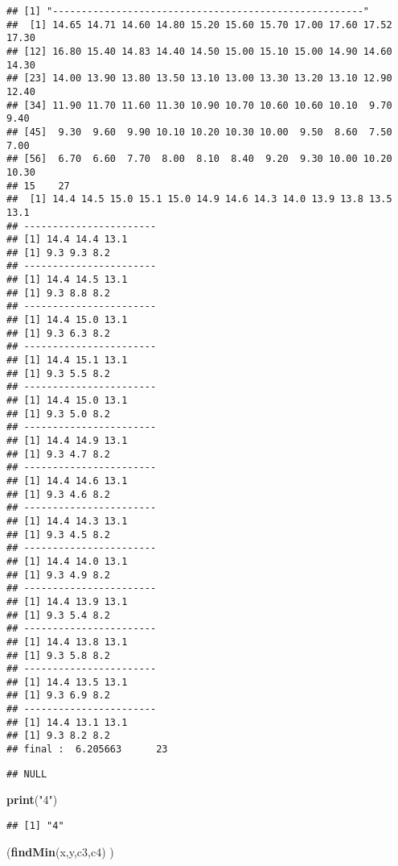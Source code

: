 \documentclass[]{article}
\newenvironment{Shaded}{\begin{snugshade}}{\end{snugshade}}
\newcommand{\KeywordTok}[1]{\textcolor[rgb]{0.13,0.29,0.53}{\textbf{#1}}}
\newcommand{\StringTok}[1]{\textcolor[rgb]{0.31,0.60,0.02}{#1}}
\newcommand{\NormalTok}[1]{#1}
\begin{document}
\begin{verbatim}
## [1] "------------------------------------------------------"
##  [1] 14.65 14.71 14.60 14.80 15.20 15.60 15.70 17.00 17.60 17.52 17.30
## [12] 16.80 15.40 14.83 14.40 14.50 15.00 15.10 15.00 14.90 14.60 14.30
## [23] 14.00 13.90 13.80 13.50 13.10 13.00 13.30 13.20 13.10 12.90 12.40
## [34] 11.90 11.70 11.60 11.30 10.90 10.70 10.60 10.60 10.10  9.70  9.40
## [45]  9.30  9.60  9.90 10.10 10.20 10.30 10.00  9.50  8.60  7.50  7.00
## [56]  6.70  6.60  7.70  8.00  8.10  8.40  9.20  9.30 10.00 10.20 10.30
## 15    27 
##  [1] 14.4 14.5 15.0 15.1 15.0 14.9 14.6 14.3 14.0 13.9 13.8 13.5 13.1
## -----------------------
## [1] 14.4 14.4 13.1
## [1] 9.3 9.3 8.2
## -----------------------
## [1] 14.4 14.5 13.1
## [1] 9.3 8.8 8.2
## -----------------------
## [1] 14.4 15.0 13.1
## [1] 9.3 6.3 8.2
## -----------------------
## [1] 14.4 15.1 13.1
## [1] 9.3 5.5 8.2
## -----------------------
## [1] 14.4 15.0 13.1
## [1] 9.3 5.0 8.2
## -----------------------
## [1] 14.4 14.9 13.1
## [1] 9.3 4.7 8.2
## -----------------------
## [1] 14.4 14.6 13.1
## [1] 9.3 4.6 8.2
## -----------------------
## [1] 14.4 14.3 13.1
## [1] 9.3 4.5 8.2
## -----------------------
## [1] 14.4 14.0 13.1
## [1] 9.3 4.9 8.2
## -----------------------
## [1] 14.4 13.9 13.1
## [1] 9.3 5.4 8.2
## -----------------------
## [1] 14.4 13.8 13.1
## [1] 9.3 5.8 8.2
## -----------------------
## [1] 14.4 13.5 13.1
## [1] 9.3 6.9 8.2
## -----------------------
## [1] 14.4 13.1 13.1
## [1] 9.3 8.2 8.2
## final :  6.205663      23
\end{verbatim}

\begin{verbatim}
## NULL
\end{verbatim}

\begin{Shaded}
\begin{Highlighting}[]
\KeywordTok{print}\NormalTok{(}\StringTok{"4"}\NormalTok{)}
\end{Highlighting}
\end{Shaded}

\begin{verbatim}
## [1] "4"
\end{verbatim}

\begin{Shaded}
\begin{Highlighting}[]
\NormalTok{(}\KeywordTok{findMin}\NormalTok{(x,y,c3,c4) ) }
\end{Highlighting}
\end{Shaded}
\end{document}
